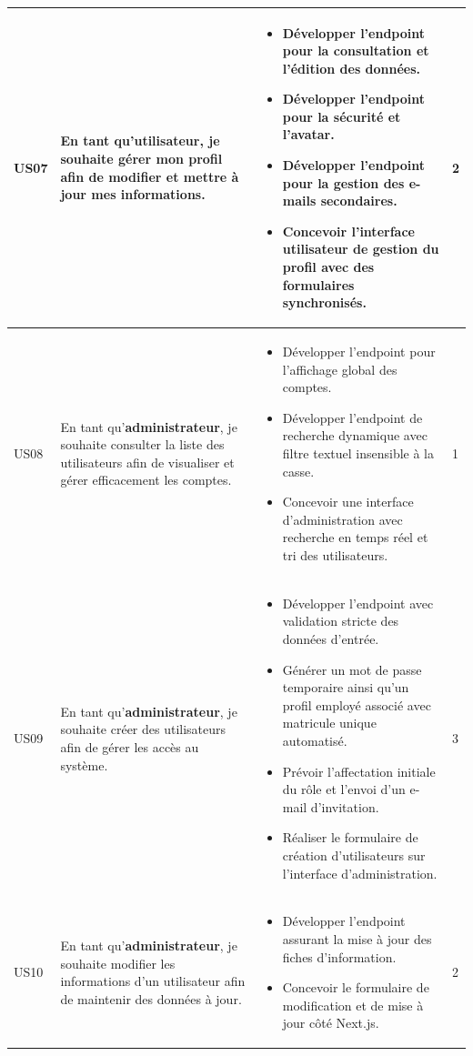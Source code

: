 \begin{longtable}{|C{1cm}|L{5.6cm}|L{8cm}|C{0.85cm}|}
US07 & En tant qu'\textbf{utilisateur}, je souhaite gérer mon profil afin de modifier et mettre à jour mes informations. &
\begin{itemize}[nosep, left=0pt, label={$\bullet$}]
\item Développer l'endpoint pour la consultation et l'édition des données.
\item Développer l'endpoint pour la sécurité et l'avatar.
\item Développer l'endpoint pour la gestion des e-mails secondaires.
\item Concevoir l'interface utilisateur de gestion du profil avec des formulaires synchronisés.
\end{itemize} & 2 \\
\hline
US08 & En tant qu'\textbf{administrateur}, je souhaite consulter la liste des utilisateurs afin de visualiser et gérer efficacement les comptes. &
\begin{itemize}[nosep, left=0pt, label={$\bullet$}]
\item Développer l'endpoint pour l'affichage global des comptes.
\item Développer l'endpoint de recherche dynamique avec filtre textuel insensible à la casse.
\item Concevoir une interface d'administration avec recherche en temps réel et tri des utilisateurs.
\end{itemize} & 1 \\
\hline
US09 & En tant qu'\textbf{administrateur}, je souhaite créer des utilisateurs afin de gérer les accès au système. &
\begin{itemize}[nosep, left=0pt, label={$\bullet$}]
\item Développer l'endpoint avec validation stricte des données d'entrée.
\item Générer un mot de passe temporaire ainsi qu'un profil employé associé avec matricule unique automatisé.
\item Prévoir l'affectation initiale du rôle et l'envoi d'un e-mail d'invitation.
\item Réaliser le formulaire de création d'utilisateurs sur l'interface d'administration.
\end{itemize} & 3 \\
\hline

US10 & En tant qu'\textbf{administrateur}, je souhaite modifier les informations d'un utilisateur afin de maintenir des données à jour. &
\begin{itemize}[nosep, left=0pt, label={$\bullet$}]
\item Développer l'endpoint assurant la mise à jour des fiches d'information.
\item Concevoir le formulaire de modification et de mise à jour côté Next.js.
\end{itemize} & 2 \\
\hline


\end{longtable}

